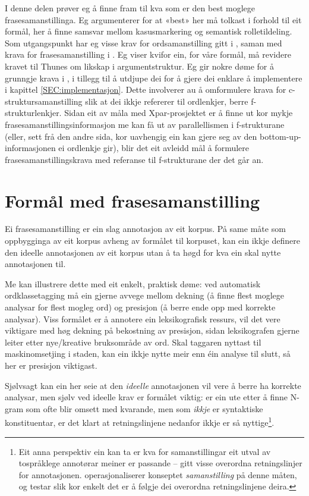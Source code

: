\documentclass[11pt,a4paper,oneside,draft]{book}
\begin{document}
I denne delen prøver eg å finne fram til kva som er den best moglege
frasesamanstillinga. Eg argumenterer for at «best» her må tolkast i
forhold til eit formål, her å finne samsvar mellom kasusmarkering og
semantisk rolletildeling. Som utgangspunkt har eg visse krav for
ordsamanstilling gitt i \citet{thunes2003eal}, saman med krava for
frasesamanstilling i \citet{dyvik2009lmp}. Eg viser kvifor ein, for
våre formål, må revidere kravet til Thunes om likskap i
argumentstruktur. Eg gir nokre døme for å grunngje krava i
\citet{dyvik2009lmp}, i tillegg til å utdjupe dei for å gjere dei
enklare å implementere i kapittel \ref{SEC:implementasjon}. Dette
involverer au å omformulere krava for c-struktursamanstilling slik at
dei ikkje refererer til ordlenkjer, berre f-strukturlenkjer. Sidan eit
av måla med Xpar-prosjektet er å finne ut kor mykje
frasesamanstillingsinformasjon me kan få ut av parallellismen i
f-strukturane (eller, sett frå den andre sida, kor uavhengig ein kan
gjere seg av den bottom-up-informasjonen ei ordlenkje gir), blir det
eit avleidd mål å formulere frasesamanstillingskrava med referanse til
f-strukturane der det går an.

\section{Formål med frasesamanstilling}
\label{sec-3.2}

\label{SEC:formaal}

Ei frasesamanstilling er ein slag annotasjon av eit korpus. På same
måte som oppbygginga av eit korpus avheng av formålet til korpuset,
kan ein ikkje definere den ideelle annotasjonen av eit korpus utan å
ta høgd for kva ein skal nytte annotasjonen til.

Me kan illustrere dette med eit enkelt, praktisk døme: ved automatisk
ordklassetagging må ein gjerne avvege mellom dekning (å finne flest
moglege analysar for flest mogleg ord) og presisjon (å berre ende opp
med korrekte analysar).  Viss formålet er å annotere ein
leksikografisk ressurs, vil det vere viktigare med høg dekning på
bekostning av presisjon, sidan leksikografen gjerne leiter etter
nye/kreative bruksområde av ord. Skal taggaren nyttast til
maskinomsetjing i staden, kan ein ikkje nytte meir enn éin analyse til
slutt, så her er presisjon viktigast.

Sjølvsagt kan ein her seie at den \emph{ideelle} annotasjonen vil vere å
berre ha korrekte analysar, men sjølv ved ideelle krav er formålet
viktig: er ein ute etter å finne N-gram som ofte blir omsett med
kvarande, men som \emph{ikkje} er syntaktiske konstituentar, er det klart
at retningslinjene nedanfor ikkje er så nyttige\footnote{Eit anna perspektiv ein kan ta er kva for samanstillingar eit
        utval av tospråklege annotørar meiner er passande -- gitt
        visse overordna retningslinjer for
        annotasjonen. \citet{volk2008hjp} operasjonaliserer konseptet
        \emph{samanstilling} på denne måten, og testar slik kor enkelt det
        er å følgje dei overordna retningslinjene deira. }.
\end{document}
